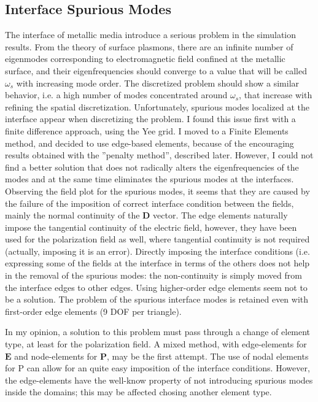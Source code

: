 \documentclass[11pt,a4paper,oneside]{article}
\begin{document}
\subsection{Interface Spurious Modes}
The interface of metallic media introduce a serious problem in the simulation results. From the theory of surface plasmons, there are an infinite number of eigenmodes corresponding to electromagnetic field confined at the metallic surface, and their eigenfrequencies should converge to a value that will be called $\omega_s$ with increasing mode order. The discretized problem should show a similar behavior, i.e. a high number of modes concentrated around $\omega_s$, that increase with refining the spatial discretization. Unfortunately, spurious modes localized at the interface appear when discretizing the problem. I found this issue first with a finite difference approach, using the Yee grid. I moved to a Finite Elements method, and decided to use edge-based elements, because of the encouraging results obtained with the ''penalty method'', described later. However, I could not find a better solution that does not radically alters the eigenfrequencies of the modes and at the same time eliminates the spurious modes at the interfaces. Observing the field plot for the spurious modes, it seems that they are caused by the failure of the imposition of correct interface condition between the fields, mainly the normal continuity of the $\boldsymbol{D}$ vector. The edge elements naturally impose the tangential continuity of the electric field, however, they have been used for the polarization field as well, where tangential continuity is not required (actually, imposing it is an error). Directly imposing the interface conditions (i.e. expressing some of the fields at the interface in terms of the others does not help in the removal of the spurious modes: the non-continuity is simply moved from the interface edges to other edges.
Using higher-order edge elements seem not to be a solution. The problem of the spurious interface modes is retained even with first-order edge elements (9 DOF per triangle).

In my opinion, a solution to this problem must pass through a change of element type, at least for the polarization field. A mixed method, with edge-elements for $\boldsymbol{E}$ and node-elements for $\boldsymbol{P}$, may be the first attempt. The use of nodal elements for P can allow for an quite easy imposition of the interface conditions. However, the edge-elements have the well-know property of not introducing spurious modes inside the domains; this may be affected chosing another element type.
\end{document}

